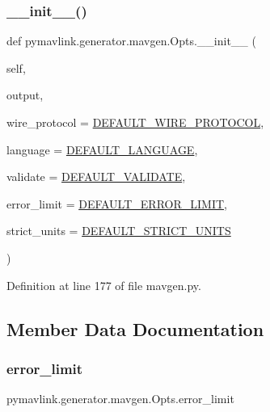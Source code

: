 \subsubsection{\texorpdfstring{\_\_init\_\_()}{\_\_init\_\_()}}
{\footnotesize\ttfamily def pymavlink.\+generator.\+mavgen.\+Opts.\+\_\+\+\_\+init\+\_\+\+\_\+ (\begin{DoxyParamCaption}\item[{}]{self,  }\item[{}]{output,  }\item[{}]{wire\+\_\+protocol = {\ttfamily \mbox{\hyperlink{namespacepymavlink_1_1generator_1_1mavgen_abf74e4464cc281c1350dae3930435bed}{D\+E\+F\+A\+U\+L\+T\+\_\+\+W\+I\+R\+E\+\_\+\+P\+R\+O\+T\+O\+C\+OL}}},  }\item[{}]{language = {\ttfamily \mbox{\hyperlink{namespacepymavlink_1_1generator_1_1mavgen_a65f98f41c53e5f7e200dc0d29d5c145d}{D\+E\+F\+A\+U\+L\+T\+\_\+\+L\+A\+N\+G\+U\+A\+GE}}},  }\item[{}]{validate = {\ttfamily \mbox{\hyperlink{namespacepymavlink_1_1generator_1_1mavgen_aee44fcfd95ce6860ecc9b4dc638b853b}{D\+E\+F\+A\+U\+L\+T\+\_\+\+V\+A\+L\+I\+D\+A\+TE}}},  }\item[{}]{error\+\_\+limit = {\ttfamily \mbox{\hyperlink{namespacepymavlink_1_1generator_1_1mavgen_abd60aefad7485fc1278640acaa724ee5}{D\+E\+F\+A\+U\+L\+T\+\_\+\+E\+R\+R\+O\+R\+\_\+\+L\+I\+M\+IT}}},  }\item[{}]{strict\+\_\+units = {\ttfamily \mbox{\hyperlink{namespacepymavlink_1_1generator_1_1mavgen_aec8e6fd33aa2b796dbad37253958f2b2}{D\+E\+F\+A\+U\+L\+T\+\_\+\+S\+T\+R\+I\+C\+T\+\_\+\+U\+N\+I\+TS}}} }\end{DoxyParamCaption})}



Definition at line 177 of file mavgen.\+py.



\subsection{Member Data Documentation}
\mbox{\label{classpymavlink_1_1generator_1_1mavgen_1_1Opts_aa2928bf27412e4e9c0e58c74268321d1}} 
\subsubsection{\texorpdfstring{error\_limit}{error\_limit}}
{\footnotesize\ttfamily pymavlink.\+generator.\+mavgen.\+Opts.\+error\+\_\+limit}



